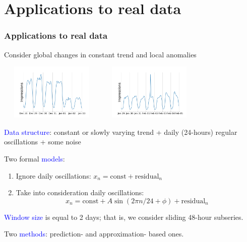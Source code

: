 \documentclass[intlimits, 9pt, unicode]{beamer}
\newcommand{\textblue}[1]{\textcolor{blue}{#1}}
\begin{document}
\section{Applications to real data}



\begin{frame}
    \frametitle{Applications to real data}

    Consider global changes in constant trend and local anomalies

\medskip
    \includegraphics[height = 2.7cm, width = 5.0cm]{images/cp_mean_2}\qquad
    \includegraphics[height = 2.7cm, width = 5.0cm]{images/005_point_2}

\medskip
\textblue{Data structure}: constant or slowly varying trend + daily (24-hours) regular oscillations + some noise

\medskip
Two formal \textblue{models}:

\medskip
\begin{enumerate}
\item
Ignore daily oscillations:
$ x_n = \mathrm{const} + \mathrm{residual}_n $
\item
Take into consideration daily oscillations:
$$ x_n = \mathrm{const} + A\sin(2\pi n/24+\phi) + \mathrm{residual}_n $$
\end{enumerate}

\medskip
\textblue{Window size} is equal to 2 days; that is, we consider sliding 48-hour subseries.

\medskip
Two \textblue{methods}: prediction- and approximation- based ones.

 \end{frame}
\end{document}
